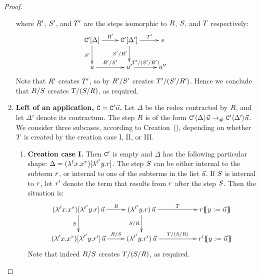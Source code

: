 \begin{proof}
\begin{enumerate}
  where $R'$, $S'$, and $T'$
  are the steps isomorphic to $R$, $S$, and $T$ respectively:
  \[
    \xymatrix{
      \con'[\Delta]
      \ar[r]^-{\redex'}
      \ar[d]_-{\redextwo'}
    &
      \con'[\Delta']
      \ar[d]_-{\redextwo'/\redex'}
      \ar[r]^-{\redexthree'}
    &
      \tmtwo
    \\
      \tmthree
      \ar[r]^-{\redex'/\redextwo'}
    &
      \ar[r]^-{\redexthree'/(\redextwo'/\redex')}
      \tmthree'
    &
      \tmthree''
    &
    }
  \]
  Note that $R'$ creates $T'$, so by \ih $R'/S'$ creates $T'/(S'/R')$.
  Hence we conclude that $R/S$ creates $T/(S/R)$,
  as required.
\item {\bf Left of an application, $\mathtt{C} = \mathtt{C}'\vec{u}$.}
  Let $\Delta$ be the redex contracted by $R$, and let $\Delta'$ denote its contractum.
  The step $R$ is of the form $\mathtt{C}'\langle\Delta\rangle\vec{u} \mathrel{\to_{\mathtt{\#}}} \mathtt{C}'\langle\Delta'\rangle\vec{u}$.
  We consider three subcases, according to Creation~(), depending on whether
  $T$ is created by the creation case I, II, or III.
  \begin{enumerate}
  \item {\bf Creation case I.}
    Then $\mathtt{C}'$ is empty and $\Delta$ has the following particular shape:
    $\Delta = (\lambda^{\ell} x. x^{\tau})[\lambda^{\ell'} y. r]$.
    The step $S$ can be either internal to the subterm $r$,
    or internal to one of the subterms in the list $\vec{u}$.
    If $S$ is internal to $r$, let $r'$ denote the term that results
    from $r$ after the step $S$. Then the situation is:
    \[
      \xymatrix{
        (\lamp{\lab}{\var}{\var^{\typ}})[\lamp{\labtwo}{\vartwo}{\tmfour}]\,\ls{\tmthree}
        \ar[r]^-{\redex}
        \ar[d]_-{\redextwo}
      &
        (\lamp{\labtwo}{\vartwo}{\tmfour})\,\ls{\tmthree}
        \ar[d]_-{\redextwo/\redex}
        \ar[rr]^-{\redexthree}
      &&
        \tmfour\sub{\vartwo}{\ls{\tmthree}}
      \\
        (\lamp{\lab}{\var}{\var^{\typ}})[\lamp{\labtwo}{\vartwo}{\tmfour'}]\,\ls{\tmthree}
        \ar[r]^-{\redex/\redextwo}
      &
        (\lamp{\labtwo}{\vartwo}{\tmfour'})\,\ls{\tmthree}
        \ar[rr]^-{\redexthree/(\redextwo/\redex)}
      &&
        \tmfour'\sub{\vartwo}{\ls{\tmthree}}
      }
    \]
    Note that indeed $R/S$ creates $T/(S/R)$, as required.

\end{enumerate}
\end{enumerate}
\end{proof}
